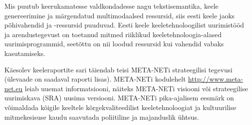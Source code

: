 \begin{multicols}{2}


Mis puutub keerukamatesse valdkondadesse nagu tekstisemantika, keele genereerimine ja märgendatud multimodaalsed ressursid, siis eesti keele jaoks põhivahendid ja -ressursid puuduvad. 
Eesti keele keeletehnoloogilist uurimistööd ja arendustegevust on toetanud mitmed riiklikud keeletehnoloogia-alased uurimisprogrammid, seetõttu on nii loodud ressursid kui vahendid vabaks kasutamiseks. 

Käesolev keeleraportite sari täiendab teisi META-NETi strateegilisi tegevusi (ülevaade on saadaval raporti lisas). META-NETi kodulehelt \url{http://www.meta-net.eu} leiab uuemat informatsiooni, näiteks META-NETi visiooni \cite{Meta1} või strateegilise uurimis\-kava (SRA) uusima versiooni. META-NETi pika-ajalisem eesmärk on võimaldada kõigile keeltele kõrgekvaliteedilist keeletehnoloogiat ja kultuurilise mitmekesisuse kaudu saavutada poliitiline ja majanduslik ühtsus.
\end{multicols}

\clearpage



